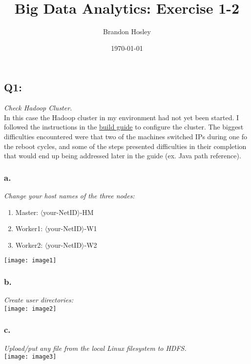 \documentclass[]{article}
\title{Big Data Analytics: Exercise 1-2}
\author{Brandon Hosley}
\date{\today}
\begin{document}
\maketitle

\subsection*{Q1:}
\emph{Check Hadoop Cluster.} \\
In this case the Hadoop cluster in my environment had not yet been started.
I followed the instructions in the 
\href{https://uispringfield.instructure.com/courses/3620/files/261572/download?wrap=1}{build guide} 
to configure the cluster.
The biggest difficulties encountered were that two of the machines switched IPs during one fo the reboot cycles, and some of the steps presented difficulties in their completion that would end up being addressed later in the guide (ex. Java path reference).

\subsubsection*{a.}
\emph{Change your host names of the three nodes:}
\begin{enumerate}
	\itemsep-0.5em 
	\item Master: $\langle$your-NetID$\rangle$-HM
	\item Worker1: $\langle$your-NetID$\rangle$-W1
	\item Worker2: $\langle$your-NetID$\rangle$-W2
\end{enumerate}
\texttt{[image: image1]} \vspace{-1.5em}

\subsubsection*{b.}
\emph{Create user directories:} \\
\texttt{[image: image2]} \vspace{-1.5em}

\subsubsection*{c.}
\emph{Upload/put any file from the local Linux filesystem to HDFS.} \\
\texttt{[image: image3]} \vspace{-1.5em}
\end{document}
